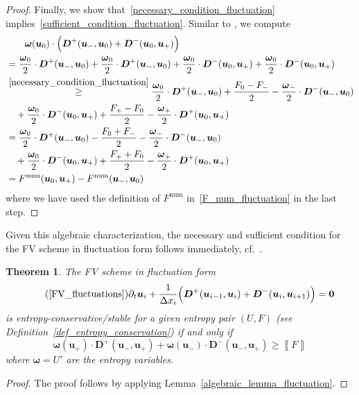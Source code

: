 \documentclass[]{scrartcl}
\renewcommand{\vec}[1]{\boldsymbol{#1}}
\newcommand{\jump}[1]{\left\llbracket #1  \right\rrbracket}
\newtheorem{theorem}{Theorem}[section]
\theoremstyle{definition}
\begin{document}
\begin{proof}
Finally, we show that~\eqref{necessary_condition_fluctuation} implies~\eqref{sufficient_condition_fluctuation}.
Similar to \cite{Castro2013}, we compute
\begin{equation}
    \begin{aligned}
        &\qquad
\vec{\omega}(\vec{u}_0) \cdot \Bigl ( \vec{D}^+(\vec{u}_-, \vec{u}_0) + \vec{D}^{-}(\vec{u}_0, \vec{u}_+) \Bigr )
\\
&=
\frac{\vec{\omega}_0}{2} \cdot \vec{D}^+(\vec{u}_-, \vec{u}_0) + \frac{\vec{\omega}_0}{2} \cdot \vec{D}^+(\vec{u}_-, \vec{u}_0)
+ \frac{\vec{\omega}_0}{2} \cdot \vec{D}^{-}(\vec{u}_0, \vec{u}_+) + \frac{\vec{\omega}_0}{2} \cdot \vec{D}^{-}(\vec{u}_0, \vec{u}_+)\\
&\stackrel{\eqref{necessary_condition_fluctuation}}{\ge}
\frac{\vec{\omega}_0}{2} \cdot \vec{D}^+(\vec{u}_-, \vec{u}_0) + \frac{F_0 - F_-}{2} - \frac{\vec{\omega}_-}{2} \cdot \vec{D}^-(\vec{u}_-,\vec{u}_0)
\\
&\quad
+ \frac{\vec{\omega}_0}{2} \cdot \vec{D}^{-}(\vec{u}_0, \vec{u}_+) + \frac{F_+ - F_0}{2} - \frac{\vec{\omega}_+}{2} \cdot \vec{D}^+(\vec{u}_0,\vec{u}_+)
\\
&=
\frac{\vec{\omega}_0}{2} \cdot \vec{D}^+(\vec{u}_-, \vec{u}_0) - \frac{F_0 + F_-}{2} - \frac{\vec{\omega}_-}{2} \cdot \vec{D}^-(\vec{u}_-,\vec{u}_0)
\\
&\quad
+ \frac{\vec{\omega}_0}{2} \cdot \vec{D}^{-}(\vec{u}_0, \vec{u}_+) + \frac{F_+ + F_0}{2} - \frac{\vec{\omega}_+}{2} \cdot \vec{D}^+(\vec{u}_0,\vec{u}_+)
\\
&= F^{\mathrm{num}}(\vec{u}_0, \vec{u}_+) - F^{\mathrm{num}}(\vec{u}_-, \vec{u}_0)
    \end{aligned}
\end{equation}
where we have used the definition of $F^{\mathrm{num}}$ in~\eqref{F_num_fluctuation} in the last step.
\end{proof}

Given this algebraic characterization, the necessary and sufficient condition for the FV scheme in fluctuation form follows immediately, cf.~\cite{Castro2013}.
\begin{theorem}{\label{fluctuation_theorem}}
The FV scheme in fluctuation form
\begin{equation}
\tag{\ref{FV_fluctuations}}
	\partial_t \vec{u}_i
    + \frac{1}{\Delta x_i} \Bigl (
        \vec{D}^+( \vec{u}_{i-1}, \vec{u}_{i} ) +
        \vec{D}^-( \vec{u}_{i}, \vec{u}_{i+1} )
    \Bigr ) = \vec{0}
\end{equation}
is entropy-conservative/stable for a given entropy pair $(U, F)$ (see Definition~\ref{def_entropy_conservation}) if and only if
\begin{equation}
\label{FluctuationDef}
 \vec{\omega}(\vec{u}_+) \cdot \vec{D}^+(\vec{u}_-, \vec{u}_+) + \vec{\omega}(\vec{u}_-) \cdot \vec{D}^-(\vec{u}_-, \vec{u}_+) \geq  \jump{F}
\end{equation}
where $\vec{\omega} = U'$ are the entropy variables.
\end{theorem}
\begin{proof}
The proof follows by applying Lemma~\ref{algebraic_lemma_fluctuation}.
\end{proof}
\end{document}
